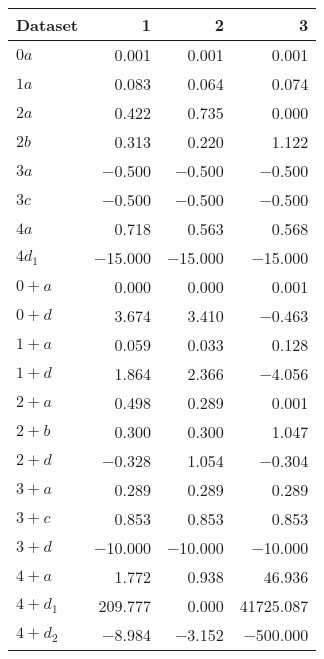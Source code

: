 \begin{tabular}{lrrr}
\toprule
 Dataset   &       1 &       2 &         3 \\
\midrule
 $0 a$     &   \num{0.001} &   \num{0.001} &     \num{0.001} \\
 $1 a$     &   \num{0.083} &   \num{0.064} &     \num{0.074} \\
 $2 a$     &   \num{0.422} &   \num{0.735} &     \num{0.000} \\
 $2 b$     &   \num{0.313} &   \num{0.220} &     \num{1.122} \\
 $3 a$     &  \num{-0.500} &  \num{-0.500} &    \num{-0.500} \\
 $3 c$     &  \num{-0.500} &  \num{-0.500} &    \num{-0.500} \\
 $4 a$     &   \num{0.718} &   \num{0.563} &     \num{0.568} \\
 $4 d_1$   & \num{-15.000} & \num{-15.000} &   \num{-15.000} \\
 $0+ a$    &   \num{0.000} &   \num{0.000} &     \num{0.001} \\
 $0+ d$    &   \num{3.674} &   \num{3.410} &    \num{-0.463} \\
 $1+ a$    &   \num{0.059} &   \num{0.033} &     \num{0.128} \\
 $1+ d$    &   \num{1.864} &   \num{2.366} &    \num{-4.056} \\
 $2+ a$    &   \num{0.498} &   \num{0.289} &     \num{0.001} \\
 $2+ b$    &   \num{0.300} &   \num{0.300} &     \num{1.047} \\
 $2+ d$    &  \num{-0.328} &   \num{1.054} &    \num{-0.304} \\
 $3+ a$    &   \num{0.289} &   \num{0.289} &     \num{0.289} \\
 $3+ c$    &   \num{0.853} &   \num{0.853} &     \num{0.853} \\
 $3+ d$    & \num{-10.000} & \num{-10.000} &   \num{-10.000} \\
 $4+ a$    &   \num{1.772} &   \num{0.938} &    \num{46.936} \\
 $4+ d_1$  & \num{209.777} &   \num{0.000} & \num{41725.087} \\
 $4+ d_2$  &  \num{-8.984} &  \num{-3.152} &  \num{-500.000} \\
\bottomrule
\end{tabular}